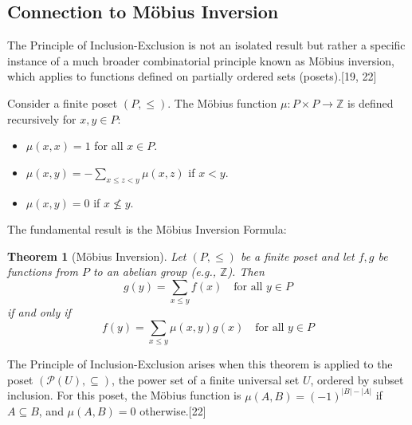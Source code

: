 \documentclass[11pt]{amsart}
\theoremstyle{plain}
\newtheorem{theorem}{Theorem}[section]
\theoremstyle{definition}
\theoremstyle{remark}
\begin{document}
\subsection{Connection to M\"obius Inversion}
The Principle of Inclusion-Exclusion is not an isolated result but rather a specific instance of a much broader combinatorial principle known as M\"obius inversion, which applies to functions defined on partially ordered sets (posets).[19, 22]

Consider a finite poset $(P, \le)$. The M\"obius function $\mu: P \times P \to \mathbb{Z}$ is defined recursively for $x, y \in P$:
\begin{itemize}
    \item $\mu(x, x) = 1$ for all $x \in P$.
    \item $\mu(x, y) = - \sum_{x \le z < y} \mu(x, z)$ if $x < y$.
    \item $\mu(x, y) = 0$ if $x \not\le y$.
\end{itemize}
The fundamental result is the M\"obius Inversion Formula:
\begin{theorem}[M\"obius Inversion]
Let $(P, \le)$ be a finite poset and let $f, g$ be functions from $P$ to an abelian group (e.g., $\mathbb{Z}$). Then
\[ g(y) = \sum_{x \le y} f(x) \quad \text{for all } y \in P \]
if and only if
\[ f(y) = \sum_{x \le y} \mu(x, y) g(x) \quad \text{for all } y \in P \]
\end{theorem}

The Principle of Inclusion-Exclusion arises when this theorem is applied to the poset $(\mathcal{P}(U), \subseteq)$, the power set of a finite universal set $U$, ordered by subset inclusion. For this poset, the M\"obius function is $\mu(A, B) = (-1)^{|B| - |A|}$ if $A \subseteq B$, and $\mu(A, B) = 0$ otherwise.[22]
\end{document}

